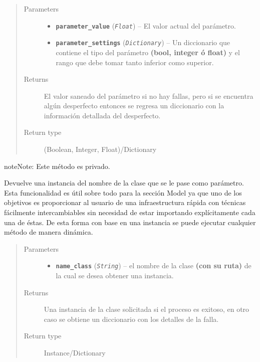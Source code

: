 \documentclass[class=report, crop=false]{standalone}
\begin{document}
\begin{fulllineitems}
\begin{fulllineitems}
\begin{quote}\begin{description}
\item[{Parameters}] \leavevmode\begin{itemize}
\item \textbf{\texttt{parameter\_value}} (\emph{\texttt{Float}}) -- El valor actual del parámetro.
\item \textbf{\texttt{parameter\_settings}} (\emph{\texttt{Dictionary}}) -- Un diccionario que contiene el tipo del parámetro \textbf{(bool, integer ó float)} y el rango que debe tomar tanto inferior como superior.
\end{itemize}
\item[{Returns}] \leavevmode
El valor saneado del parámetro si no hay fallas, pero si se encuentra algún desperfecto entonces se regresa un diccionario con la información detallada del desperfecto.
\item[{Return type}] \leavevmode
(Boolean, Integer, Float)/Dictionary
\end{description}\end{quote}

\end{fulllineitems}

\begin{fulllineitems}

\begin{notice}{note}{Note:}
Este método es privado.
\end{notice}

Devuelve una instancia del nombre de la clase que se le pase
como parámetro.\break
Esta funcionalidad es útil sobre todo para la sección Model ya que
uno de los objetivos es proporcionar al usuario de una infraestructura 
rápida con técnicas fácilmente intercambiables sin necesidad de estar
importando explícitamente cada una de éstas.\break
De esta forma con base en una instancia se puede ejecutar 
cualquier método de manera dinámica.

\begin{quote}\begin{description}
\item[{Parameters}] \leavevmode\begin{itemize}
\item \textbf{\texttt{name\_class}} (\emph{\texttt{String}}) -- el nombre de la clase \textbf{(con su ruta)} de la cual se desea obtener una instancia.
\end{itemize}
\item[{Returns}] \leavevmode
Una instancia de la clase solicitada si el proceso es exitoso, en otro caso se obtiene un diccionario con los detalles de la falla.
\item[{Return type}] \leavevmode
Instance/Dictionary
\end{description}\end{quote}


\end{fulllineitems}
\end{fulllineitems}
\end{document}
